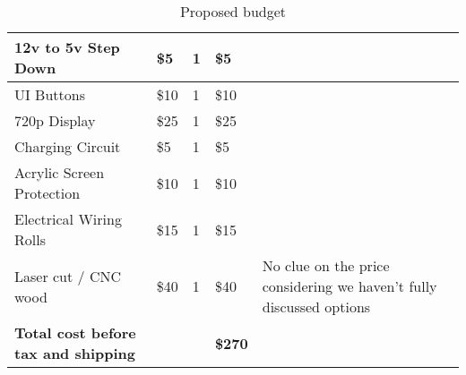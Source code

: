 \begin{table}[h!]
{\begin{tabular}{|l|l|l|l|l|}
    12v to 5v Step Down                           & \$5             & 1                   & \$5              &                                                                       \\ \hline
    UI Buttons                                    & \$10            & 1                   & \$10             &                                                                       \\ \hline
    720p Display                                  & \$25            & 1                   & \$25             &                                                                       \\ \hline
    Charging Circuit                              & \$5             & 1                   & \$5              &                                                                       \\ \hline
    Acrylic Screen Protection                     & \$10            & 1                   & \$10             &                                                                       \\ \hline
    Electrical Wiring Rolls                       & \$15            & 1                   & \$15             &                                                                       \\ \hline
    Laser cut / CNC wood                          & \$40            & 1                   & \$40             & No clue on the price considering we haven't fully discussed options   \\ \hline
    \textbf{Total cost before tax and shipping }  &                 &                     & \textbf{\$270 }  &                                                                       \\ \hline
  \end{tabular}}
  \caption{Proposed budget}
  \label{Tab:budget}
\end{table}

